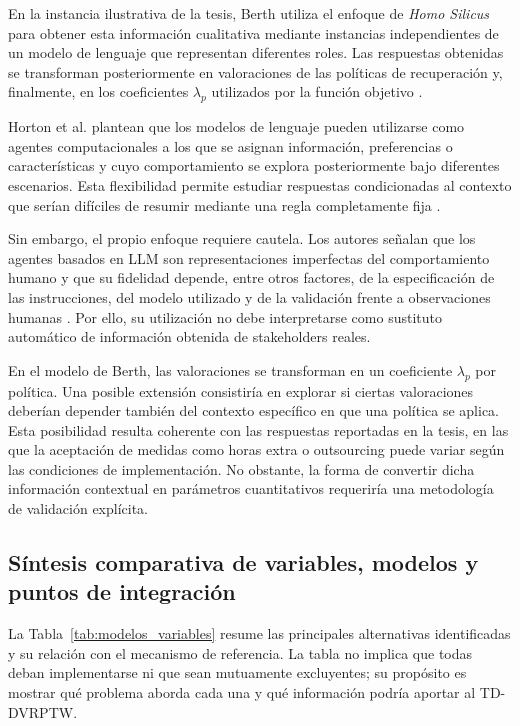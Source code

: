 \documentclass[11pt]{article}
\begin{document}
En la instancia ilustrativa de la tesis, Berth utiliza el enfoque de \textit{Homo Silicus}
para obtener esta información cualitativa mediante instancias independientes de un
modelo de lenguaje que representan diferentes roles. Las respuestas obtenidas se
transforman posteriormente en valoraciones de las políticas de recuperación y,
finalmente, en los coeficientes \(\lambda_p\) utilizados por la función objetivo
\parencite{berth_thesis_2025,horton_filippas_manning_2023}.

Horton et al. plantean que los modelos de lenguaje pueden utilizarse como agentes
computacionales a los que se asignan información, preferencias o características y
cuyo comportamiento se explora posteriormente bajo diferentes escenarios. Esta
flexibilidad permite estudiar respuestas condicionadas al contexto que serían difíciles
de resumir mediante una regla completamente fija
\parencite{horton_filippas_manning_2023}.

Sin embargo, el propio enfoque requiere cautela. Los autores señalan que los agentes
basados en LLM son representaciones imperfectas del comportamiento humano y que
su fidelidad depende, entre otros factores, de la especificación de las instrucciones,
del modelo utilizado y de la validación frente a observaciones humanas
\parencite{horton_filippas_manning_2023}. Por ello, su utilización no debe
interpretarse como sustituto automático de información obtenida de stakeholders
reales.

En el modelo de Berth, las valoraciones se transforman en un coeficiente
\(\lambda_p\) por política. Una posible extensión consistiría en explorar si ciertas
valoraciones deberían depender también del contexto específico en que una política
se aplica. Esta posibilidad resulta coherente con las respuestas reportadas en la tesis,
en las que la aceptación de medidas como horas extra o outsourcing puede variar
según las condiciones de implementación. No obstante, la forma de convertir dicha
información contextual en parámetros cuantitativos requeriría una metodología de
validación explícita.

\subsection{Síntesis comparativa de variables, modelos y puntos de integración}

La Tabla~\ref{tab:modelos_variables} resume las principales alternativas identificadas
y su relación con el mecanismo de referencia. La tabla no implica que todas deban
implementarse ni que sean mutuamente excluyentes; su propósito es mostrar qué
problema aborda cada una y qué información podría aportar al TD-DVRPTW.
\end{document}
